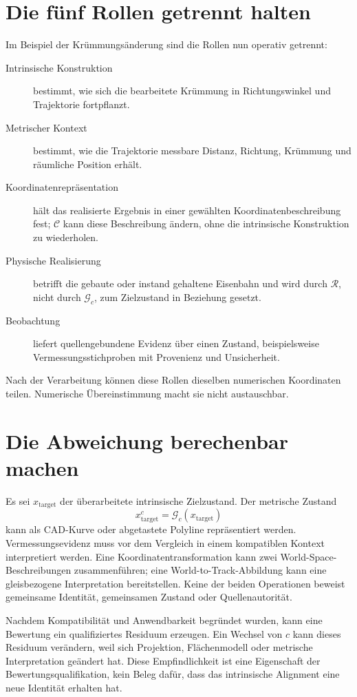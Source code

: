 \section{Die fünf Rollen getrennt halten}

Im Beispiel der Krümmungsänderung sind die Rollen nun operativ getrennt:

\begin{description}
\item[Intrinsische Konstruktion] bestimmt, wie sich die bearbeitete Krümmung
  in Richtungswinkel und Trajektorie fortpflanzt.
\item[Metrischer Kontext] bestimmt, wie die Trajektorie messbare Distanz,
  Richtung, Krümmung und räumliche Position erhält.
\item[Koordinatenrepräsentation] hält das realisierte Ergebnis in einer
  gewählten Koordinatenbeschreibung fest; \(\mathcal C\) kann diese
  Beschreibung ändern, ohne die intrinsische Konstruktion zu wiederholen.
\item[Physische Realisierung] betrifft die gebaute oder instand gehaltene
  Eisenbahn und wird durch \(\mathcal R\), nicht durch \(\mathcal G_c\), zum
  Zielzustand in Beziehung gesetzt.
\item[Beobachtung] liefert quellengebundene Evidenz über einen Zustand,
  beispielsweise Vermessungsstichproben mit Provenienz und Unsicherheit.
\end{description}

Nach der Verarbeitung können diese Rollen dieselben numerischen Koordinaten
teilen. Numerische Übereinstimmung macht sie nicht austauschbar.

\section{Die Abweichung berechenbar machen}

Es sei \(x_{\mathrm{target}}\) der überarbeitete intrinsische Zielzustand. Der
metrische Zustand
\[
x_{\mathrm{target}}^{c}=\mathcal G_c(x_{\mathrm{target}})
\]
kann als CAD-Kurve oder abgetastete Polyline repräsentiert werden.
Vermessungsevidenz muss vor dem Vergleich in einem kompatiblen Kontext
interpretiert werden. Eine Koordinatentransformation kann zwei
World-Space-Beschreibungen zusammenführen; eine World-to-Track-Abbildung kann
eine gleisbezogene Interpretation bereitstellen. Keine der beiden Operationen
beweist gemeinsame Identität, gemeinsamen Zustand oder Quellenautorität.

Nachdem Kompatibilität und Anwendbarkeit begründet wurden, kann eine Bewertung
ein qualifiziertes Residuum erzeugen. Ein Wechsel von \(c\) kann dieses
Residuum verändern, weil sich Projektion, Flächenmodell oder metrische
Interpretation geändert hat. Diese Empfindlichkeit ist eine Eigenschaft der
Bewertungsqualifikation, kein Beleg dafür, dass das intrinsische Alignment
eine neue Identität erhalten hat.

